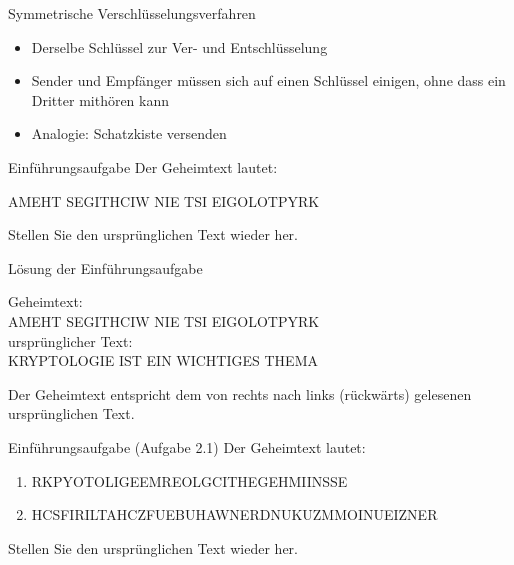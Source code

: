 \begin{frame}{Symmetrische Verschlüsselungsverfahren}
    \begin{itemize}[<+->]
        \item {} Derselbe Schlüssel zur Ver- und Entschlüsselung
        \item {} Sender und Empfänger müssen sich auf einen Schlüssel einigen, ohne dass ein Dritter mithören kann
        \item {} Analogie: Schatzkiste versenden
    \end{itemize}

\end{frame}

\begin{frame}[label=intro1]{Einführungsaufgabe}
    Der Geheimtext lautet:
    \begin{center}
        AMEHT SEGITHCIW NIE TSI EIGOLOTPYRK
    \end{center}
    Stellen Sie den ursprünglichen Text wieder her.
\end{frame}

\begin{frame}[label=intro1Sol]{Lösung der Einführungsaufgabe}
    \begin{center}
    
        Geheimtext:\\
        AMEHT SEGITHCIW NIE TSI EIGOLOTPYRK\\
        \bigskip
        ursprünglicher Text:\\
        KRYPTOLOGIE IST EIN WICHTIGES THEMA\\
    \end{center}
    Der Geheimtext entspricht dem von rechts nach links (rückwärts) gelesenen ursprünglichen Text.
\end{frame}

\begin{frame}[label=intro2]{Einführungsaufgabe (Aufgabe 2.1)}
    Der Geheimtext lautet:
    \begin{center}
    \small
        \begin{enumerate}
            \item RKPYOTOLIGEEMREOLGCITHEGEHMIINSSE
            \item HCSFIRILTAHCZFUEBUHAWNERDNUKUZMMOINUEIZNER
        \end{enumerate}
        \normalsize
    \end{center}
    Stellen Sie den ursprünglichen Text wieder her.
\end{frame}

